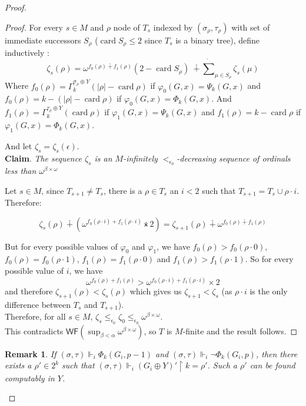 \documentclass{article}
\numberwithin{theorem}{section}
\newtheorem{remark}[theorem]{Remark}
\newcommand{\WF}{\mathsf{WF}}
\newcommand{\uh}[0]{{\upharpoonright}}
\newcommand{\card}{\operatorname{card}}
\newcommand{\nplus}{\dotplus}
\newcommand{\ntimes}{\dottimes}
\newcommand{\nsum}{\dot{\sum}}
\begin{document}
\begin{proof}
\begin{proof}
For every $s \in M$ and $\rho$ node of $T_s$ indexed by $(\sigma_{\rho}, \tau_{\rho})$ with set of immediate successors $S_\rho$ ($\card S_\rho \leq 2$ since $T_s$ is a binary tree), define inductively :
$$\zeta_s(\rho) = \omega^{f_0(\rho) \nplus f_1(\rho)}(2 - \card S_\rho)\ \nplus \nsum_{\mu \in S_\rho} \zeta_s(\mu)
$$
Where $f_0(\rho) = \Gamma_k^{\sigma_{\rho} \oplus Y}(|\rho| - \card \rho)$ if $\varphi_0(G,x) = \Psi_k(G,x)$ and $f_0(\rho) = k - (|\rho| - \card \rho)$ if $\varphi_0(G,x) = \Phi_k(G,x)$. And $f_1(\rho) = \Gamma_k^{\tau_{\rho} \oplus Y}(\card \rho)$ if $\varphi_1(G,x) = \Psi_k(G,x)$ and $f_1(\rho) = k - \card \rho$ if $\varphi_1(G,x) = \Phi_k(G,x)$.

And let $\zeta_s = \zeta_s(\epsilon)$. \\

\textbf{Claim}. \emph{The sequence $\zeta_s$ is an $M$-infinitely $<_{\epsilon_0}$-decreasing sequence of ordinals less than $\omega^{\beta \times \omega}$}

Let $s \in M$, since $T_{s+1} \neq T_s$, there is a $\rho \in T_s$ an $i < 2$ such that $T_{s+1} = T_s \cup \rho \cdot i$. Therefore:

$$\zeta_{s}(\rho) \nplus (\omega^{f_0(\rho \cdot i) + f_1(\rho \cdot i)} \ntimes 2) = \zeta_{s+1}(\rho) \nplus \omega^{f_0(\rho) \nplus f_1(\rho)}$$

But for every possible values of $\varphi_0$ and $\varphi_1$, we have $f_0(\rho) > f_0(\rho \cdot 0)$, $f_0(\rho) = f_0(\rho \cdot 1)$, $f_1(\rho) = f_1(\rho \cdot 0)$ and $f_1(\rho) > f_1(\rho \cdot 1)$. So for every possible value of $i$, we have 
$$\omega^{f_0(\rho) + f_1(\rho)} > \omega^{f_0(\rho \cdot i) + f_1(\rho \cdot i)} \times 2$$
and therefore $\zeta_{s+1}(\rho) < \zeta_s(\rho)$ which gives us $\zeta_{s+1} < \zeta_s$ (as $\rho \cdot i$ is the only difference between $T_s$ and $T_{s+1}$). \\

Therefore, for all $s \in M$, $\zeta_s \leq_{\epsilon_0} \zeta_0 \leq_{\epsilon_0} \omega^{\beta \times \omega}$. \\

This contradicts $\WF(\sup_{\beta < \alpha} \omega^{\beta \times \omega})$, so $T$ is $M$-finite and the result follows.
\end{proof}

\begin{remark}
If $(\sigma, \tau) \Vdash_i  \Phi_k(G_i,p-1)$ and $(\sigma, \tau) \Vdash_i \neg \Phi_k(G_i,p)$, then there exists a $\rho' \in 2^k$ such that  $(\sigma, \tau) \Vdash_i (G_i \oplus Y)' \uh k = \rho'$. Such a $\rho'$ can be found computably in $Y$. 


\end{remark}
\end{proof}
\end{document}
